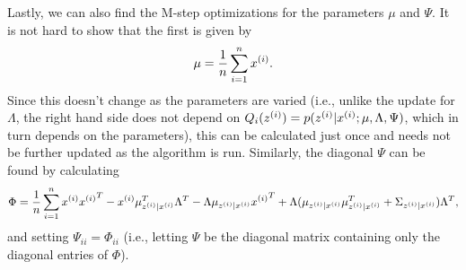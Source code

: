 \documentclass{article}
\begin{document}
Lastly, we can also find the M-step optimizations for the parameters $\mu$ and $\Psi$.
It is not hard to show that the first is given by
\[
\mu = \frac{1}{{n}}\sum_{i=1}^{n} {x^{(i)}}.
\]
Since this doesn't change as the parameters are varied (i.e., unlike the update for $\Lambda$, the
right hand side
does not depend on $Q_i({z^{(i)}}) = p({z^{(i)}}|{x^{(i)}}; \mu, \Lambda, \Psi)$, which in turn depends on the parameters),
this can be calculated just once and needs not be further updated as the algorithm is
run.  Similarly, the diagonal $\Psi$ can be found by calculating
\[
\Phi = \frac{1}{{n}} \sum_{i=1}^{n} {x^{(i)}} {x^{(i)}}^T -
{x^{(i)}} \mu_{{z^{(i)}}|{x^{(i)}}}^T \Lambda^T
- \Lambda \mu_{{z^{(i)}}|{x^{(i)}}} {x^{(i)}}^T +
\Lambda (\mu_{{z^{(i)}}|{x^{(i)}}} \mu_{{z^{(i)}}|{x^{(i)}}}^T + \Sigma_{{z^{(i)}}|{x^{(i)}}})\Lambda^T,
\]
and setting $\Psi_{ii} = \Phi_{ii}$ (i.e., letting $\Psi$ be the diagonal matrix
containing only the diagonal entries of $\Phi$).




\end{document}
